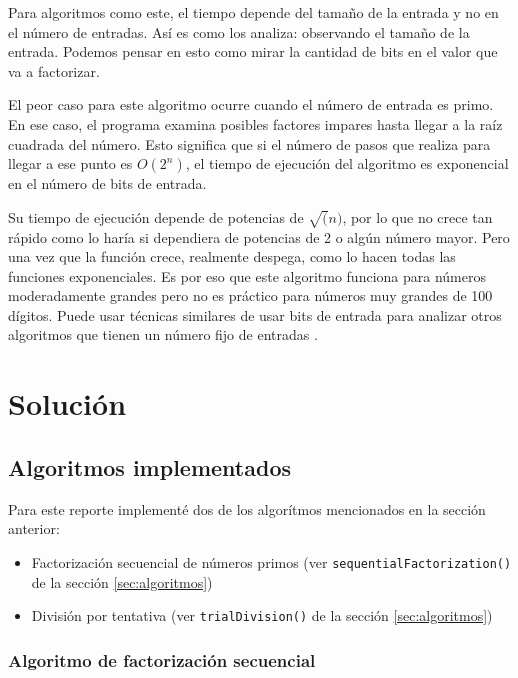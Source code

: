 \documentclass{article}
\begin{document}
Para algoritmos como este, el tiempo depende del tamaño de la entrada y no en el
número de entradas. Así es como los analiza: observando el tamaño de la entrada.
Podemos pensar en esto como mirar la cantidad de bits en el valor que va a
factorizar.

El peor caso para este algoritmo ocurre cuando el número de entrada es primo. En
ese caso, el programa examina posibles factores impares hasta llegar a la raíz
cuadrada del número. Esto significa que si el número de pasos que realiza para
llegar a ese punto es $ O(2^n)$, el tiempo de ejecución del algoritmo es
exponencial en el número de bits de entrada.

Su tiempo de ejecución depende de potencias de $\sqrt(n)$, por lo que no crece
tan rápido como lo haría si dependiera de potencias de 2 o algún número mayor.
Pero una vez que la función crece, realmente despega, como lo hacen todas las
funciones exponenciales. Es por eso que este algoritmo funciona para números
moderadamente grandes pero no es práctico para números muy grandes de 100
dígitos. Puede usar técnicas similares de usar bits de entrada para analizar
otros algoritmos que tienen un número fijo de entradas
\cite{stephens2015learning}.


\section{Solución}

\subsection{Algoritmos implementados}

Para este reporte implementé dos de los algorítmos mencionados en la sección
anterior:

\begin{itemize}
\item Factorización secuencial de números primos (ver
\texttt{sequentialFactorization()} de la sección \ref{sec:algoritmos})
    \item División por tentativa (ver
    \texttt{trialDivision()} de la sección \ref{sec:algoritmos})
\end{itemize}

\subsubsection{Algoritmo de factorización secuencial}
\end{document}
